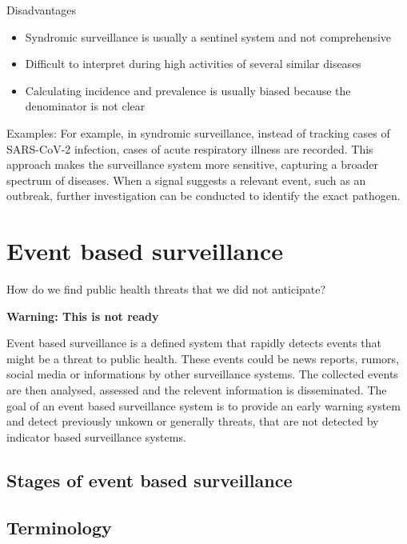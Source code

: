 \documentclass[
  letterpaper,
  DIV=11,
  numbers=noendperiod]{scrreprt}
\providecommand{\tightlist}{%
  \setlength{\itemsep}{0pt}\setlength{\parskip}{0pt}}\usepackage{longtable,booktabs,array}
\begin{document}
Disadvantages

\begin{itemize}
\tightlist
\item
  Syndromic surveillance is usually a sentinel system and not
  comprehensive
\item
  Difficult to interpret during high activities of several similar
  diseases
\item
  Calculating incidence and prevalence is usually biased because the
  denominator is not clear
\end{itemize}

Examples: For example, in syndromic surveillance, instead of tracking
cases of SARS-CoV-2 infection, cases of acute respiratory illness are
recorded. This approach makes the surveillance system more sensitive,
capturing a broader spectrum of diseases. When a signal suggests a
relevant event, such as an outbreak, further investigation can be
conducted to identify the exact pathogen.

\chapter{Event based surveillance}\label{event-based-surveillance}

How do we find public health threats that we did not anticipate?

\hfill\break

\textbf{Warning: This is not ready}

Event based surveillance is a defined system that rapidly detects events
that might be a threat to public health. These events could be news
reports, rumors, social media or informations by other surveillance
systems. The collected events are then analysed, assessed and the
relevent information is disseminated. The goal of an event based
surveillance system is to provide an early warning system and detect
previously unkown or generally threats, that are not detected by
indicator based surveillance systems.

\section{Stages of event based
surveillance}\label{stages-of-event-based-surveillance}

\section{Terminology}\label{terminology-1}
\end{document}
